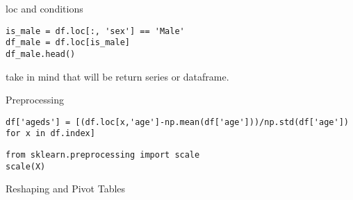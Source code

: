 \documentclass{beamer}
\begin{document}
\begin{frame}[fragile]{loc and conditions}
\begin{lstlisting}
is_male = df.loc[:, 'sex'] == 'Male'
df_male = df.loc[is_male]
df_male.head()
\end{lstlisting}
\end{frame}


\begin{frame}
take in mind that will be return series or dataframe.
\end{frame}


\begin{frame}[fragile]{Preprocessing}
\begin{lstlisting}
df['ageds'] = [(df.loc[x,'age']-np.mean(df['age']))/np.std(df['age']) for x in df.index]
\end{lstlisting}
\end{frame}

\begin{frame}[fragile]
\begin{lstlisting}
from sklearn.preprocessing import scale
scale(X)
\end{lstlisting}
\end{frame}



\begin{frame}{Reshaping and Pivot Tables}




\end{frame}
\end{document}
